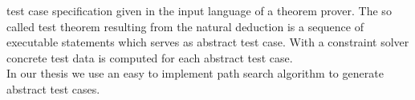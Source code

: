 test case specification given in the input language of a theorem prover. The so called test theorem resulting from the natural deduction is a sequence of executable statements which serves as abstract test case. With a constraint solver concrete test data is computed for each abstract test case.\\
In our thesis we use an easy to implement path search algorithm to generate abstract test cases.
